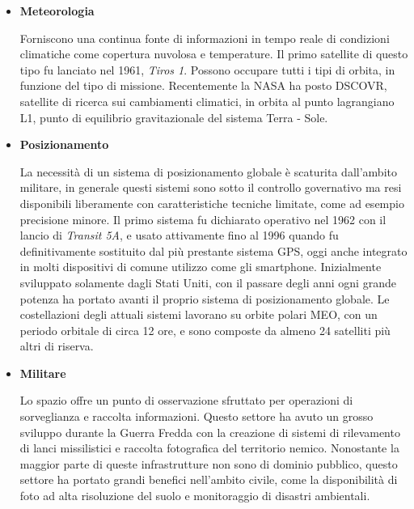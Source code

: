 \documentclass[12pt,a4paper,oneside]{book}
\begin{document}
\begin{itemize}
				\item {\bf Meteorologia}
				
				Forniscono una continua fonte di informazioni in tempo reale di condizioni climatiche come copertura nuvolosa e temperature. Il primo satellite di questo tipo fu lanciato nel 1961, {\it Tiros 1}. Possono occupare tutti i tipi di orbita, in funzione del tipo di missione. Recentemente la NASA ha posto DSCOVR, satellite di ricerca sui cambiamenti climatici, in orbita al punto lagrangiano L1, punto di equilibrio gravitazionale del sistema Terra - Sole.
				
				\item {\bf Posizionamento}
				
				La necessità di un sistema di posizionamento globale è scaturita dall'ambito militare, in generale questi sistemi sono sotto il controllo governativo ma resi disponibili liberamente con caratteristiche tecniche limitate, come ad esempio precisione minore. Il primo sistema fu dichiarato operativo nel 1962 con il lancio di {\it Transit 5A}, e usato attivamente fino al 1996 quando fu definitivamente sostituito dal più prestante sistema GPS, oggi anche integrato in molti dispositivi di comune utilizzo come gli smartphone. Inizialmente sviluppato solamente dagli Stati Uniti, con il passare degli anni ogni grande potenza ha portato avanti il proprio sistema di posizionamento globale. Le costellazioni degli attuali sistemi lavorano su orbite polari MEO, con un periodo orbitale di circa 12 ore, e sono composte da almeno 24 satelliti più altri di riserva. 
				
				\item {\bf Militare}
				
				Lo spazio offre un punto di osservazione sfruttato per operazioni di sorveglianza e raccolta informazioni. Questo settore ha avuto un grosso sviluppo durante la Guerra Fredda con la creazione di sistemi di rilevamento di lanci missilistici e raccolta fotografica del territorio nemico. Nonostante la maggior parte di queste infrastrutture non sono di dominio pubblico, questo settore ha portato grandi benefici nell'ambito civile, come la disponibilità di foto ad alta risoluzione del suolo e monitoraggio di disastri ambientali.
				
			\end{itemize}
			
\end{document}
